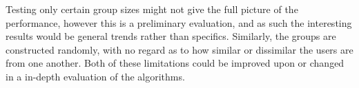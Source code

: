 Testing only certain group sizes might not give the full picture of the performance, however this is a preliminary evaluation, and as such the interesting results would be general trends rather than specifics. Similarly, the groups are constructed randomly, with no regard as to how similar or dissimilar the users are from one another. Both of these limitations could be improved upon or changed in a in-depth evaluation of the algorithms.